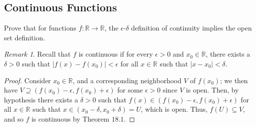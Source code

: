 \documentclass[12pt]{article}
\theoremstyle{remark}
\newtheorem*{remark}{Remark}
\begin{document}
\subsection{Continuous Functions}
\begin{problem}
  Prove that for functions $f\colon \mathbb{R} \to \mathbb{R}$, the $\epsilon$-$\delta$ definition of continuity implies the open set definition.
\end{problem}
\begin{remark}
  Recall that $f$ is continuous if for every $\epsilon > 0$ and $x_0 \in \mathbb{R}$, there exists a $\delta > 0$ such that $|f(x) - f(x_0)| < \epsilon$ for all $x \in \mathbb{R}$ such that $|x-x_0| < \delta$.
\end{remark}
\begin{proof}
  Consider $x_0 \in \mathbb{R}$, and a corresponding neighborhood $V$ of $f(x_0)$; we then have $V \supseteq (f(x_0)-\epsilon,f(x_0)+\epsilon)$ for some $\epsilon > 0$ since $V$ is open. Then, by hypothesis there exists a $\delta > 0$ such that $f(x) \in (f(x_0)-\epsilon,f(x_0)+\epsilon)$ for all $x \in \mathbb{R}$ such that $x \in (x_0-\delta,x_0+\delta) = U$, which is open. Thus, $f(U) \subseteq V$, and so $f$ is continuous by Theorem $18.1$.
\end{proof}
\end{document}
